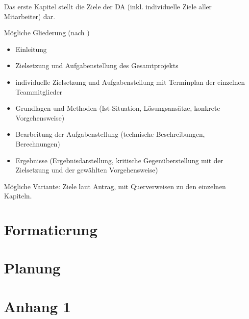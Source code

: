 \documentclass[
    headings=optiontotocandhead,%
    twoside,
    numbers=noenddot,%
    toc=flat, %
    12pt, %
    titlepage, %
    parskip=full, %
    listof=totoc, %
    listof=flat, %
    numbers=noenddot, %
    bibliography=totoc, %
    a4paper,DIV=14,
    BCOR=15mm,
]{scrbook}
\begin{document}
Das erste Kapitel stellt die Ziele der DA (inkl. individuelle Ziele
aller Mitarbeiter) dar.

Mögliche Gliederung (nach \cite{leitfaden})

\begin{itemize}
\item  Einleitung
\item   Zielsetzung und Aufgabenstellung des Gesamtprojekts
\item   individuelle Zielsetzung und Aufgabenstellung mit Terminplan der einzelnen Teammitglieder
\item   Grundlagen und Methoden (Ist-Situation, Lösungsansätze, konkrete Vorgehensweise)
\item   Bearbeitung der Aufgabenstellung (technische Beschreibungen, Berechnungen)
\item   Ergebnisse (Ergebnisdarstellung, kritische Gegenüberstellung mit der Zielsetzung
 und der gewählten Vorgehensweise)
\end{itemize}

Mögliche Variante: Ziele laut Antrag, mit Querverweisen zu den einzelnen Kapiteln.

\chapter{Formatierung}

\renewcommand{\kapitelautor}{Autor: Hans Huber}





\chapter{Planung}


%

%




\appendix

\chapter{Anhang 1\label{chap:Anhang-1}}
\end{document}
